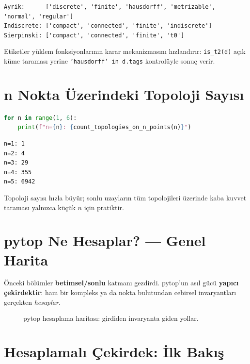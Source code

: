 \begin{verbatim}
Ayrik:      ['discrete', 'finite', 'hausdorff', 'metrizable', 'normal', 'regular']
Indiscrete: ['compact', 'connected', 'finite', 'indiscrete']
Sierpinski: ['compact', 'connected', 'finite', 't0']
\end{verbatim}

Etiketler yüklem fonksiyonlarının karar mekanizmasını hızlandırır:
\texttt{is\_t2(d)} açık küme taraması yerine \texttt{'hausdorff' in d.tags}
kontrolüyle sonuç verir.

\section{n Nokta Üzerindeki Topoloji Sayısı}

\begin{lstlisting}[language=Python]
for n in range(1, 6):
    print(f"n={n}: {count_topologies_on_n_points(n)}")
\end{lstlisting}

\begin{verbatim}
n=1: 1
n=2: 4
n=3: 29
n=4: 355
n=5: 6942
\end{verbatim}

Topoloji sayısı hızla büyür; sonlu uzayların tüm topolojileri üzerinde kaba
kuvvet taraması yalnızca küçük $n$ için pratiktir.

\section{pytop Ne Hesaplar? — Genel Harita}

Önceki bölümler \textbf{betimsel/sonlu} katmanı gezdirdi. pytop'un asıl gücü
\textbf{yapıcı çekirdektir}: ham bir kompleks ya da nokta bulutundan cebirsel
invaryantları gerçekten \emph{hesaplar}.

\begin{figure}[ht]
\centering

\caption{pytop hesaplama haritası: girdiden invaryanta giden yollar.}
\end{figure}

\section{Hesaplamalı Çekirdek: İlk Bakış}

